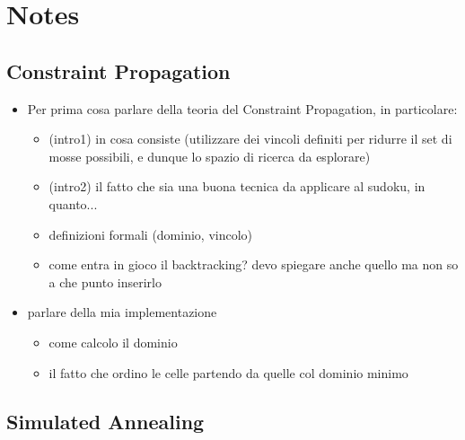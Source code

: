 \chapter{Notes}

\section{Constraint Propagation}

\begin{itemize}
    \item Per prima cosa parlare della teoria del Constraint Propagation, in particolare:
    \begin{itemize}
        \item (intro1) in cosa consiste (utilizzare dei vincoli definiti per ridurre il set di mosse possibili, e dunque lo spazio di ricerca da esplorare)
        \item (intro2) il fatto che sia una buona tecnica da applicare al sudoku, in quanto...
        \item definizioni formali (dominio, vincolo)
        \item come entra in gioco il backtracking? devo spiegare anche quello ma non so a che punto inserirlo
    \end{itemize}
    \item parlare della mia implementazione
    \begin{itemize}
        \item come calcolo il dominio
        \item il fatto che ordino le celle partendo da quelle col dominio minimo
    \end{itemize}
\end{itemize}

\section{Simulated Annealing}

